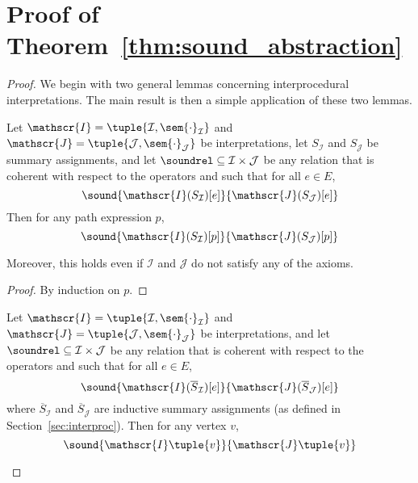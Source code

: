 



\appendix

 \section{Proof of Theorem~\ref{thm:sound_abstraction}}
 \begin{proof}
   We begin with two general lemmas concerning interprocedural
   interpretations.  The main result is then a simple application of these two
   lemmas.
   \begin{lemma} \label{lem:pathexp_rel}
     Let $\mathscr{I} = \tuple{\mathcal{I}, \sem{\cdot}_{\mathcal{I}}}$ and
     $\mathscr{J} = \tuple{\mathcal{J},\sem{\cdot}_{\mathcal{J}}}$ be \QPKA{}
     interpretations, let $S_{\mathcal{I}}$ and $S_{\mathcal{J}}$ be summary
     assignments, and let $\soundrel \subseteq \mathcal{I} \times \mathcal{J}$ be
     any relation that is coherent with respect to the \QPKA{} operators and
     such that for all $e \in E$, 
     \[ \sound{\mathscr{I}(S_{\mathcal{I}})[e]}{\mathscr{J}(S_\mathcal{J})[e]} \]
     Then for any path expression $p$,
     \[ \sound{\mathscr{I}(S_{\mathcal{I}})[p]}{\mathscr{J}(S_\mathcal{J})[p]} \]

     Moreover, this holds even if $\mathcal{I}$ and $\mathcal{J}$ do not
     satisfy any of the \QPKA{} axioms.
   \end{lemma}
   \begin{proof}
     By induction on $p$.
   \end{proof}
   \begin{lemma} \label{lem:analysis_rel}
     Let $\mathscr{I} = \tuple{\mathcal{I}, \sem{\cdot}_{\mathcal{I}}}$ and
     $\mathscr{J} = \tuple{\mathcal{J},\sem{\cdot}_{\mathcal{J}}}$ be \QPKA{}
     interpretations, and let $\soundrel \subseteq \mathcal{I}
     \times \mathcal{J}$ be any relation that is coherent with respect to the
     \QPKA{} operators and such that for all $e \in E$,
     \[ \sound{\mathscr{I}(\overline{S}_{\mathcal{I}})[e]}{\mathscr{J}(\overline{S}_\mathcal{J})[e]} \]
     where $\overline{S}_{\mathcal{I}}$ and $\overline{S}_{\mathcal{J}}$ are
     inductive summary assignments (as defined in
     Section~\ref{sec:interproc}). Then for any vertex $v$,
     \[ \sound{\mathscr{I}\tuple{v}}{\mathscr{J}\tuple{v}} \]


\end{lemma}
\end{proof}
